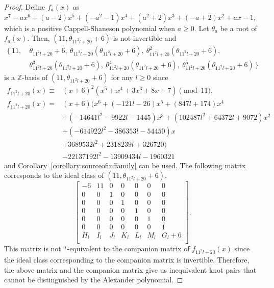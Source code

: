 \documentclass[12pt]{amsart}
\theoremstyle{plain}
\theoremstyle{definition}
\theoremstyle{remark}
\renewcommand{\(}{\big(}
\renewcommand{\)}{\big)}
\theoremstyle{plain}
\theoremstyle{definition}
\begin{document}
\begin{proof}
    Define $f_a(x)$ as $x^7-ax^6+(a-2)x^5+(-a^2-1)x^4+(a^2+2)x^3+(-a+2)x^2+ax-1$, which is a positive Cappell-Shaneson polynomial when $a \ge 0$. Let $\theta_a$ be a root of $f_a(x)$. Then, $(11, \theta_{11^2l+20} + 6)$ is not invertible and 
    \[
    \begin{aligned}
    \{\,11,\ &\theta_{11^2l+20} + 6, \ \theta_{11^2l+20} ( \theta_{11^2l+20} + 6), \ \theta_{11^2l+20}^2 (\theta_{11^2l+20} + 6), \\ &\theta_{11^2l+20}^3 (\theta_{11^2l+20} + 6), \ \theta_{11^2l+20}^4 (\theta_{11^2l+20} + 6), \ \theta_{11^2l+20}^5 (\theta_{11^2l+20} + 6)\, \}
    \end{aligned}
    \]
    is a $\mathbb{Z}$-basis of $(11, \theta_{11^2l+20} + 6)$ for any $l \ge 0$ since
    \begin{align*}
        f_{11^2l+20}(x)\equiv &(x+6)^2(x^5+x^4+3x^3+8x+7) \pmod {11} ,\\
        f_{11^2l+20}(x) = &(x+6)(x^6+(-121l-26)x^5+(847l+174)x^4\\
                        &+(-14641l^2-9922l-1445)x^3+(102487l^2+64372l+9072)x^2\\
                        &+(-614922l^2-386353l-54450)x\\
                        &+3689532l^2+2318239l+326720)\\
                        &-22137192l^2-13909434l-1960321
    \end{align*}
    and Corollary~\ref{corollary:sourceofinffamily} can be used. The following matrix corresponds to the ideal class of $(11, \theta_{11^2l+20} + 6)$,
    \[
        \begin{bmatrix}
    	-6 & 11 & 0 & 0 & 0 & 0 & 0\\
            0 & 0 & 1 & 0 & 0 & 0 & 0\\
            0 & 0 & 0 & 1 & 0 & 0 & 0\\
            0 & 0 & 0 & 0 & 1 & 0 & 0\\
            0 & 0 & 0 & 0 & 0 & 1 & 0\\
            0 & 0 & 0 & 0 & 0 & 0 & 1\\
            H_l & I_l & J_l & K_l & L_l & M_l & G_l+6\\
    		\end{bmatrix}.
    \]
    This matrix is not $*$-equivalent to the companion matrix of $f_{11^2l+20}(x)$ since the ideal class corresponding to the companion matrix is invertible. Therefore, the above matrix and the companion matrix give us inequivalent knot pairs that cannot be distinguished by the Alexander polynomial.
\end{proof}




\end{document}
